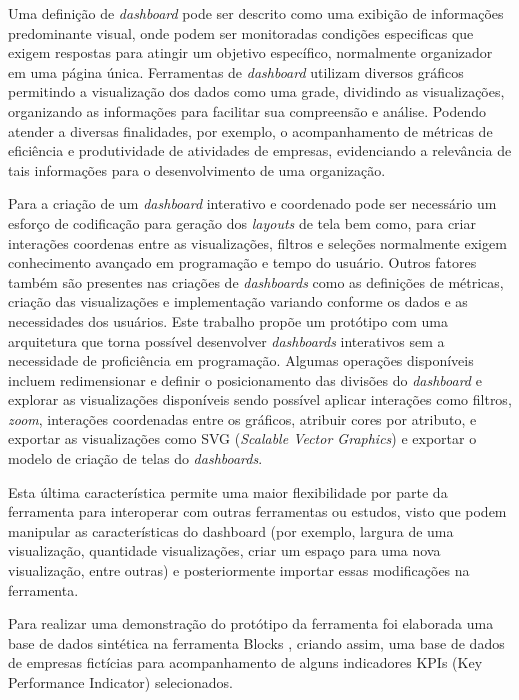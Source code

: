 \documentclass[
	12pt,				%
	openright,			%
	oneside,			%
	a4paper,			%
	english,			%
	brazil				%
	]{abntex2}
\begin{document}
Uma definição de \textit{dashboard} \cite{Sarikaya} pode ser descrito como uma exibição de informações predominante visual, onde podem ser monitoradas condições especificas que exigem respostas para atingir um objetivo específico, normalmente organizador em uma página única. 
Ferramentas de \textit{dashboard} utilizam diversos gráficos permitindo a visualização dos dados como uma grade, dividindo as visualizações, organizando as informações para facilitar sua compreensão e análise. Podendo atender a diversas finalidades, por exemplo, o acompanhamento de métricas de eficiência e produtividade de atividades de empresas, evidenciando a relevância de tais informações para o desenvolvimento de uma organização.

Para a criação de um \textit{dashboard} interativo e coordenado pode ser necessário um esforço de codificação para geração dos \textit{layouts} de tela bem como, para criar interações coordenas entre as visualizações, filtros e seleções normalmente exigem conhecimento avançado em programação e tempo do usuário. Outros fatores também são presentes nas criações de \textit{dashboards} como as definições de métricas, criação das visualizações e implementação variando conforme os dados e as necessidades dos usuários. Este trabalho propõe um protótipo com uma arquitetura que torna possível desenvolver \textit{dashboards} interativos sem a necessidade de proficiência em programação. Algumas operações disponíveis incluem redimensionar e definir o posicionamento das divisões do \textit{dashboard} e explorar as visualizações disponíveis sendo possível aplicar interações como filtros, \textit{zoom}, interações coordenadas entre os gráficos, atribuir cores por atributo, e exportar as visualizações como SVG (\textit{Scalable Vector Graphics}) e exportar o modelo de criação de telas do \textit{dashboards}.

Esta última característica permite uma maior flexibilidade por parte da ferramenta para interoperar com outras ferramentas ou estudos, visto que podem manipular as características do dashboard (por exemplo, largura de uma visualização, quantidade visualizações, criar um espaço para uma nova visualização, entre outras) e posteriormente importar essas modificações na ferramenta.

Para realizar uma demonstração do protótipo da ferramenta foi elaborada uma base de dados sintética na ferramenta Blocks \cite{blocks}, criando assim, uma base de dados de empresas fictícias para acompanhamento de alguns indicadores KPIs (Key Performance Indicator) selecionados.
\end{document}
